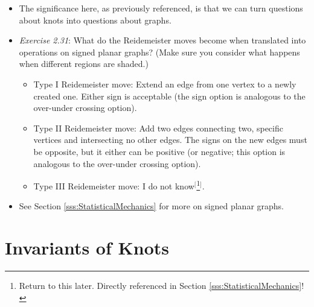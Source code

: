 \documentclass[titlepage]{article}
\numberwithin{figure}{section}
\numberwithin{table}{section}
\numberwithin{equation}{section}
\begin{document}
\begin{itemize}
    \item The significance here, as previously referenced, is that we can turn questions about knots into questions about graphs.
    \item \emph{Exercise 2.31}: What do the Reidemeister moves become when translated into operations on signed planar graphs? (Make sure you consider what happens when different regions are shaded.)
    \begin{itemize}
        \item Type I Reidemeister move: Extend an edge from one vertex to a newly created one. Either sign is acceptable (the sign option is analogous to the over-under crossing option).
        \item Type II Reidemeister move: Add two edges connecting two, specific vertices and intersecting no other edges. The signs on the new edges must be opposite, but it either can be positive (or negative; this option is analogous to the over-under crossing option).
        \item Type III Reidemeister move: I do not know$^[$\footnote{Return to this later. Directly referenced in Section \ref{sss:StatisticalMechanics}!}$^]$.
    \end{itemize}
    \item See Section \ref{sss:StatisticalMechanics} for more on signed planar graphs.
\end{itemize}
\newpage



\section{Invariants of Knots}
\end{document}
